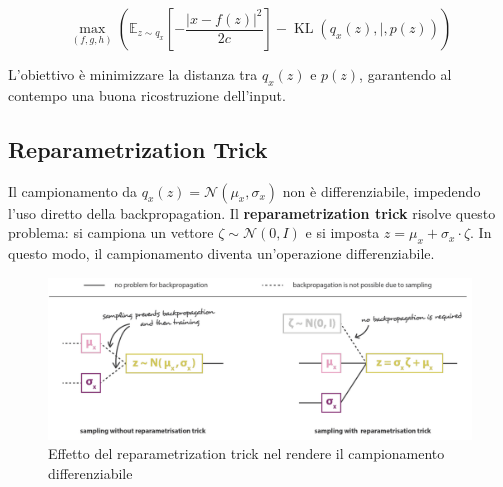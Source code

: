 \begin{equation}
\max_{(f,g,h)} \left( \mathbb{E}_{z\sim q_x}\left[-\frac{|x - f(z)|^2}{2c}\right] - \operatorname{KL}(q_x(z),|,p(z)) \right)
\end{equation}

L’obiettivo è minimizzare la distanza tra $q_x(z)$ e $p(z)$, garantendo al contempo una buona ricostruzione dell’input.

\subsection{Reparametrization Trick}

Il campionamento da $q_x(z) = \mathcal{N}(\mu_x, \sigma_x)$ non è differenziabile, impedendo l’uso diretto della backpropagation. Il \textbf{reparametrization trick} risolve questo problema: si campiona un vettore $\zeta \sim \mathcal{N}(0,I)$ e si imposta $z = \mu_x + \sigma_x \cdot \zeta$. In questo modo, il campionamento diventa un'operazione differenziabile.

\begin{figure}[!ht]
\centering
\includegraphics[width=\textwidth]{figure/RepTrick.png}
\caption{Effetto del reparametrization trick nel rendere il campionamento differenziabile}
\label{fig:repTrick}
\end{figure}

